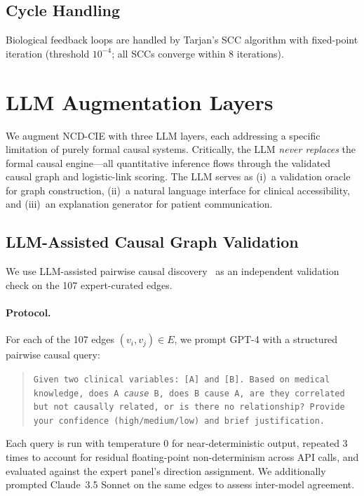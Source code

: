 \documentclass[runningheads]{llncs}
\begin{document}
\subsection{Cycle Handling}\label{sec:cycles}

Biological feedback loops are handled by Tarjan's SCC algorithm
with fixed-point iteration (threshold $10^{-4}$; all SCCs converge
within 8 iterations).

\section{LLM Augmentation Layers}\label{sec:llm}

We augment NCD-CIE with three LLM layers, each addressing a
specific limitation of purely formal causal systems.
Critically, the LLM \emph{never replaces} the formal causal
engine---all quantitative inference flows through the
validated causal graph and logistic-link scoring.
The LLM serves as (i)~a validation oracle for graph construction,
(ii)~a natural language interface for clinical accessibility, and
(iii)~an explanation generator for patient communication.

\subsection{LLM-Assisted Causal Graph Validation}\label{sec:llmvalidation}

We use LLM-assisted pairwise causal
discovery~\cite{kiciman2023causal} as an independent validation
check on the 107 expert-curated edges.

\paragraph{Protocol.}
For each of the 107 edges $(v_i, v_j) \in E$, we prompt GPT-4
with a structured pairwise causal query:
\begin{quote}
\small\texttt{Given two clinical variables: [A] and [B].
Based on medical knowledge, does A \emph{cause} B, does B cause A,
are they correlated but not causally related, or is there no
relationship? Provide your confidence (high/medium/low) and
brief justification.}
\end{quote}
Each query is run with temperature 0 for near-deterministic output,
repeated 3 times to account for residual floating-point
non-determinism across API calls, and evaluated against the expert
panel's direction assignment.
We additionally prompted Claude~3.5 Sonnet on the same edges to
assess inter-model agreement.
\end{document}
